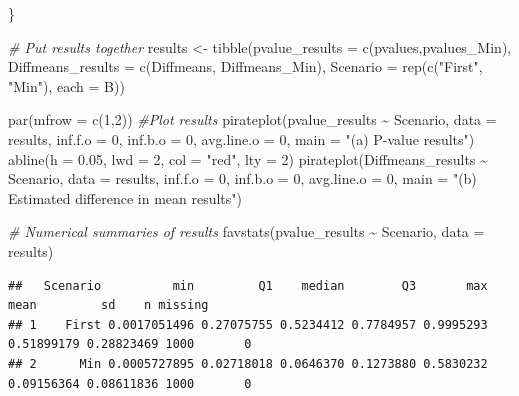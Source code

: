 \documentclass[
]{book}
\newenvironment{Shaded}{\begin{snugshade}}{\end{snugshade}}
\newcommand{\AttributeTok}[1]{\textcolor[rgb]{0.77,0.63,0.00}{#1}}
\newcommand{\CommentTok}[1]{\textcolor[rgb]{0.56,0.35,0.01}{\textit{#1}}}
\newcommand{\DecValTok}[1]{\textcolor[rgb]{0.00,0.00,0.81}{#1}}
\newcommand{\FloatTok}[1]{\textcolor[rgb]{0.00,0.00,0.81}{#1}}
\newcommand{\FunctionTok}[1]{\textcolor[rgb]{0.00,0.00,0.00}{#1}}
\newcommand{\NormalTok}[1]{#1}
\newcommand{\OtherTok}[1]{\textcolor[rgb]{0.56,0.35,0.01}{#1}}
\newcommand{\SpecialCharTok}[1]{\textcolor[rgb]{0.00,0.00,0.00}{#1}}
\newcommand{\StringTok}[1]{\textcolor[rgb]{0.31,0.60,0.02}{#1}}
\begin{document}
\begin{Shaded}
\begin{Highlighting}[]
\NormalTok{\}}

\CommentTok{\# Put results together}
\NormalTok{results }\OtherTok{\textless{}{-}} \FunctionTok{tibble}\NormalTok{(}\AttributeTok{pvalue\_results =} \FunctionTok{c}\NormalTok{(pvalues,pvalues\_Min), }
                  \AttributeTok{Diffmeans\_results =} \FunctionTok{c}\NormalTok{(Diffmeans, Diffmeans\_Min), }
                  \AttributeTok{Scenario =} \FunctionTok{rep}\NormalTok{(}\FunctionTok{c}\NormalTok{(}\StringTok{"First"}\NormalTok{, }\StringTok{"Min"}\NormalTok{), }\AttributeTok{each =}\NormalTok{ B))}

\FunctionTok{par}\NormalTok{(}\AttributeTok{mfrow =} \FunctionTok{c}\NormalTok{(}\DecValTok{1}\NormalTok{,}\DecValTok{2}\NormalTok{)) }\CommentTok{\#Plot results}
\FunctionTok{pirateplot}\NormalTok{(pvalue\_results }\SpecialCharTok{\textasciitilde{}}\NormalTok{ Scenario, }\AttributeTok{data =}\NormalTok{ results, }\AttributeTok{inf.f.o =} \DecValTok{0}\NormalTok{, }\AttributeTok{inf.b.o =} \DecValTok{0}\NormalTok{,}
           \AttributeTok{avg.line.o =} \DecValTok{0}\NormalTok{, }\AttributeTok{main =} \StringTok{"(a) P{-}value results"}\NormalTok{)}
\FunctionTok{abline}\NormalTok{(}\AttributeTok{h =} \FloatTok{0.05}\NormalTok{, }\AttributeTok{lwd =} \DecValTok{2}\NormalTok{, }\AttributeTok{col =} \StringTok{"red"}\NormalTok{, }\AttributeTok{lty =} \DecValTok{2}\NormalTok{)}
\FunctionTok{pirateplot}\NormalTok{(Diffmeans\_results }\SpecialCharTok{\textasciitilde{}}\NormalTok{ Scenario, }\AttributeTok{data =}\NormalTok{ results, }\AttributeTok{inf.f.o =} \DecValTok{0}\NormalTok{, }\AttributeTok{inf.b.o =} \DecValTok{0}\NormalTok{,}
           \AttributeTok{avg.line.o =} \DecValTok{0}\NormalTok{, }\AttributeTok{main =} \StringTok{"(b) Estimated difference in mean results"}\NormalTok{)}
\end{Highlighting}
\end{Shaded}

\small

\begin{Shaded}
\begin{Highlighting}[]
\CommentTok{\# Numerical summaries of results}
\FunctionTok{favstats}\NormalTok{(pvalue\_results }\SpecialCharTok{\textasciitilde{}}\NormalTok{ Scenario, }\AttributeTok{data =}\NormalTok{ results)}
\end{Highlighting}
\end{Shaded}

\begin{verbatim}
##   Scenario          min         Q1    median        Q3       max       mean         sd    n missing
## 1    First 0.0017051496 0.27075755 0.5234412 0.7784957 0.9995293 0.51899179 0.28823469 1000       0
## 2      Min 0.0005727895 0.02718018 0.0646370 0.1273880 0.5830232 0.09156364 0.08611836 1000       0
\end{verbatim}
\end{document}
